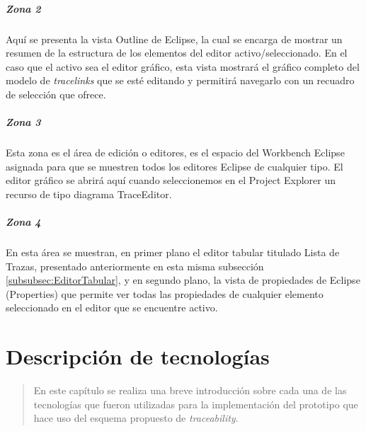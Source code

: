 \documentclass[a4paper,12pt,twoside,spanish,openright]{book}
\begin{document}
\paragraph{Zona 2}
Aquí se presenta la vista \textsf{Outline} de \textsf{Eclipse}, la cual se encarga de mostrar un resumen de la estructura de los elementos del editor activo/seleccionado. En el caso que el activo sea el editor gráfico, esta vista mostrará el gráfico completo del modelo de \textit{tracelinks} que se esté editando y permitirá navegarlo con un recuadro de selección que ofrece.


\paragraph{Zona 3}
Esta zona es el área de edición o editores, es el espacio del Workbench \textsf{Eclipse} asignada para que se muestren todos los editores \textsf{Eclipse} de cualquier tipo. El editor gráfico se abrirá aquí cuando seleccionemos en el \textsf{Project Explorer} un recurso de tipo diagrama \textsf{TraceEditor}.


\paragraph{Zona 4}
En esta área se muestran, en primer plano el editor tabular titulado \textsf{Lista de Trazas}, presentado anteriormente en esta misma subsección \ref{subsubsec:EditorTabular}, y en segundo plano, la vista de propiedades de \textsf{Eclipse} (\textsf{Properties}) que permite ver todas las propiedades de cualquier elemento seleccionado en el editor que se encuentre activo.




\chapter{Descripción de tecnologías}

\begin{quotation}
En este capítulo se realiza una breve introducción sobre cada una de las tecnologías que fueron utilizadas para la implementación del prototipo que hace uso del esquema propuesto de \textit{traceability}.
\end{quotation}


\bigskip


\minitoc 


\clearpage
\end{document}
